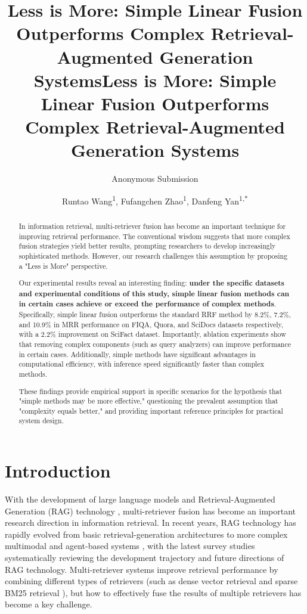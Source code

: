\documentclass[letterpaper]{article} %
\title{Less is More: Simple Linear Fusion Outperforms Complex Retrieval-Augmented Generation Systems}
\title{Less is More: Simple Linear Fusion Outperforms Complex Retrieval-Augmented Generation Systems}
\author{
    Anonymous Submission
}
\author{
    Runtao Wang\textsuperscript{\rm 1},
    Fufangchen Zhao\textsuperscript{\rm 1},
    Danfeng Yan\textsuperscript{\rm 1,*}
}
\begin{document}
\maketitle

\begin{abstract}
In information retrieval, multi-retriever fusion has become an important technique for improving retrieval performance. The conventional wisdom suggests that more complex fusion strategies yield better results, prompting researchers to develop increasingly sophisticated methods. However, our research challenges this assumption by proposing a "Less is More" perspective.

Our experimental results reveal an interesting finding: \textbf{under the specific datasets and experimental conditions of this study, simple linear fusion methods can in certain cases achieve or exceed the performance of complex methods}. Specifically, simple linear fusion outperforms the standard RRF method by 8.2\%, 7.2\%, and 10.9\% in MRR performance on FIQA, Quora, and SciDocs datasets respectively, with a 2.2\% improvement on SciFact dataset. Importantly, ablation experiments show that removing complex components (such as query analyzers) can improve performance in certain cases. Additionally, simple methods have significant advantages in computational efficiency, with inference speed significantly faster than complex methods.

These findings provide empirical support in specific scenarios for the hypothesis that "simple methods may be more effective," questioning the prevalent assumption that "complexity equals better," and providing important reference principles for practical system design.
\end{abstract}


\section{Introduction}

With the development of large language models and Retrieval-Augmented Generation (RAG) technology \cite{lewis2020retrieval}, multi-retriever fusion has become an important research direction in information retrieval. In recent years, RAG technology has rapidly evolved from basic retrieval-generation architectures to more complex multimodal \cite{chen2022multimodal} and agent-based systems \cite{singh2025agentic}, with the latest survey studies \cite{gao2024retrieval} systematically reviewing the development trajectory and future directions of RAG technology. Multi-retriever systems improve retrieval performance by combining different types of retrievers (such as dense vector retrieval \cite{karpukhin2020dense} and sparse BM25 retrieval \cite{robertson2009probabilistic}), but how to effectively fuse the results of multiple retrievers has become a key challenge.
\end{document}
